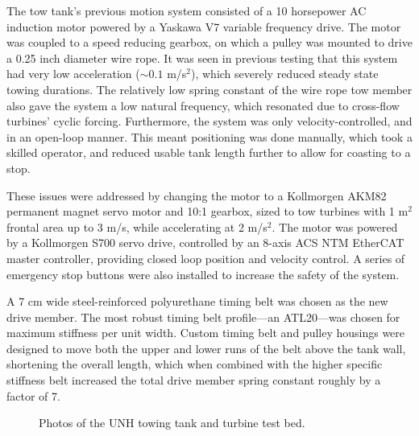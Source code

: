 The tow tank's previous motion system consisted of a 10 horsepower AC induction
motor powered by a Yaskawa V7 variable frequency drive. The motor was coupled to
a speed reducing gearbox, on which a pulley was mounted to drive a 0.25 inch
diameter wire rope. It was seen in previous testing that this system had very
low acceleration ($\sim 0.1$ m/s$^2$), which severely reduced steady state
towing durations. The relatively low spring constant of the wire rope tow member
also gave the system a low natural frequency, which resonated due to cross-flow
turbines' cyclic forcing. Furthermore, the system was only velocity-controlled,
and in an open-loop manner. This meant positioning was done manually, which took
a skilled operator, and reduced usable tank length further to allow for coasting
to a stop.

These issues were addressed by changing the motor to a Kollmorgen AKM82
permanent magnet servo motor and 10:1 gearbox, sized to tow turbines with 1
m$^2$ frontal area up to 3 m/s, while accelerating at 2 m/s$^2$. The motor was
powered by a Kollmorgen S700 servo drive, controlled by an 8-axis ACS NTM
EtherCAT master controller, providing closed loop position and velocity control.
A series of emergency stop buttons were also installed to increase the safety of
the system.

A 7 cm wide steel-reinforced polyurethane timing belt was chosen as the new
drive member. The most robust timing belt profile---an ATL20---was chosen for
maximum stiffness per unit width. Custom timing belt and pulley housings were
designed to move both the upper and lower runs of the belt above the tank wall,
shortening the overall length, which when combined with the higher specific
stiffness belt increased the total drive member spring constant roughly by a
factor of 7.




\begin{figure}[ht!]
    \centering 
    \caption{Photos of the UNH towing tank and turbine test bed.} 
\end{figure}


